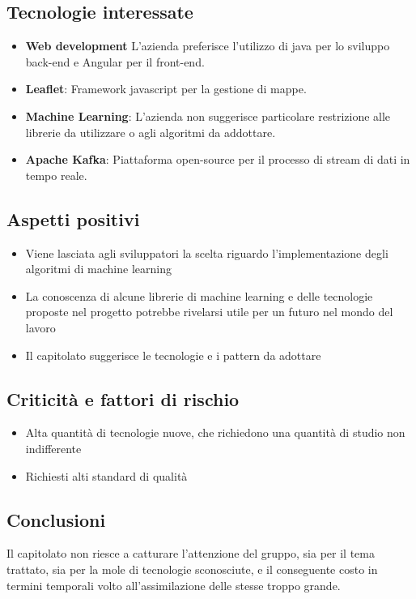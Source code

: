 \subsection{Tecnologie interessate}
\begin{itemize}
    \item \textbf{Web development} L'azienda preferisce l'utilizzo di java per lo sviluppo back-end e Angular per il front-end.
    \item \textbf{Leaflet}: Framework javascript per la gestione di mappe.
    \item \textbf{Machine Learning}: L'azienda non suggerisce particolare restrizione alle librerie da utilizzare o agli algoritmi da addottare.
    \item \textbf{Apache Kafka}: Piattaforma open-source per il processo di stream di dati in tempo reale.
\end{itemize}
\subsection{Aspetti positivi}
\begin{itemize}
    \item Viene lasciata agli sviluppatori la scelta riguardo l'implementazione degli algoritmi di machine learning
    \item La conoscenza di alcune librerie di machine learning e delle tecnologie proposte nel progetto potrebbe rivelarsi utile per un futuro nel mondo del lavoro
    \item Il capitolato suggerisce le tecnologie e i pattern da adottare
\end{itemize}
\subsection{Criticità e fattori di rischio}
\begin{itemize}
    \item Alta quantità di tecnologie nuove, che richiedono una quantità di studio non indifferente
    \item Richiesti alti standard di qualità
\end{itemize}
\subsection{Conclusioni}
Il capitolato non riesce a catturare l'attenzione del gruppo, sia per il tema trattato, sia per la mole di tecnologie sconosciute, e il conseguente costo in termini temporali volto all'assimilazione delle stesse troppo grande.

